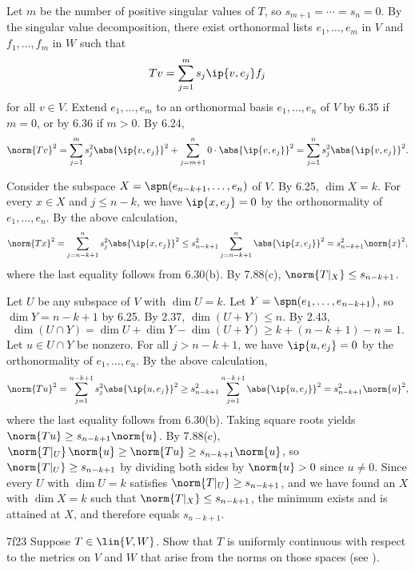 \begin{sol}
    Let $m$ be the number of positive singular values of $T$, so $s_{m+1} = \cdots = s_n = 0$.
    By the singular value decomposition, there exist orthonormal lists $e_1, \ldots, e_m$ in $V$ and $f_1, \ldots, f_m$ in $W$ such that
    \[
        Tv = \sum_{j=1}^{m} s_j \ip{v, e_j} f_j
    \]
    for all $v \in V$.
    Extend $e_1, \ldots, e_m$ to an orthonormal basis $e_1, \ldots, e_n$ of $V$ by 6.35 if $m = 0$, or by 6.36 if $m > 0$.
    By 6.24,
    \[
        \norm{Tv}^2 = \sum_{j=1}^{m} s_j^2 \abs{\ip{v, e_j}}^2 + \sum_{j=m+1}^{n} 0 \cdot \abs{\ip{v, e_j}}^2 = \sum_{j=1}^{n} s_j^2 \abs{\ip{v, e_j}}^2.
    \]
    
    \rightineq Consider the subspace $X = \spn(e_{n-k+1}, \ldots, e_n)$ of $V$.
    By 6.25, $\dim X = k$.
    For every $x \in X$ and $j \leq n-k$, we have $\ip{x, e_j} = 0$ by the orthonormality of $e_1, \ldots, e_n$.
    By the above calculation,
    \[
        \norm{Tx}^2 = \sum_{j=n-k+1}^{n} s_j^2 \abs{\ip{x, e_j}}^2 \leq s_{n-k+1}^2 \sum_{j=n-k+1}^{n} \abs{\ip{x, e_j}}^2 = s_{n-k+1}^2 \norm{x}^2,
    \]
    where the last equality follows from 6.30(b).
    By 7.88(c), $\norm{T|_X} \leq s_{n-k+1}$.

    \leftineq Let $U$ be any subspace of $V$ with $\dim U = k$.
    Let $Y = \spn(e_1, \ldots, e_{n-k+1})$, so $\dim Y = n-k+1$ by 6.25.
    By 2.37, $\dim(U + Y) \leq n$.
    By 2.43,
    \[
        \dim(U \cap Y) = \dim U + \dim Y - \dim(U + Y) \geq k + (n-k+1) - n = 1.
    \]
    Let $u \in U \cap Y$ be nonzero.
    For all $j > n-k+1$, we have $\ip{u, e_j} = 0$ by the orthonormality of $e_1, \ldots, e_n$.
    By the above calculation,
    \[
        \norm{Tu}^2 = \sum_{j=1}^{n-k+1} s_j^2 \abs{\ip{u, e_j}}^2 \geq s_{n-k+1}^2 \sum_{j=1}^{n-k+1} \abs{\ip{u, e_j}}^2 = s_{n-k+1}^2 \norm{u}^2,
    \]
    where the last equality follows from 6.30(b).
    Taking square roots yields $\norm{Tu} \geq s_{n-k+1} \norm{u}$.
    By 7.88(c), $\norm{T|_U}\,\norm{u} \geq \norm{Tu} \geq s_{n-k+1} \norm{u}$, so $\norm{T|_U} \geq s_{n-k+1}$ by dividing both sides by $\norm{u} > 0$ since $u \neq 0$.
    Since every $U$ with $\dim U = k$ satisfies $\norm{T|_U} \geq s_{n-k+1}$, and we have found an $X$ with $\dim X = k$ such that $\norm{T|_X} \leq s_{n-k+1}$, the minimum exists and is attained at $X$, and therefore equals $s_{n-k+1}$.
\end{sol}

\begin{exercise}{7f23}
    Suppose $T \in \lin{V, W}$.
    Show that $T$ is uniformly continuous with respect to the metrics on $V$ and $W$ that arise from the norms on those spaces (see ).

\end{exercise}


